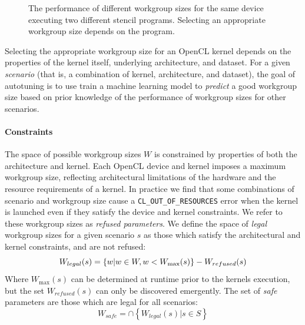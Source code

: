 \documentclass{acaces}
\begin{document}
\begin{figure}
{\begin{minipage}{.48\textwidth}
\begin{subfigure}[h]{.48\columnwidth}
      \vspace{-1.5em} %
      \caption{}
      \label{fig:motivation-4}
    \end{subfigure}
    \caption{%
      The performance of different workgroup sizes for the same device
      executing two different stencil programs. Selecting an appropriate
      workgroup size depends on the program.%
    }
    \label{fig:motivation-prog}
  \end{minipage}%
}
\end{figure}


Selecting the appropriate workgroup size for an OpenCL kernel depends
on the properties of the kernel itself, underlying architecture, and
dataset. For a given \emph{scenario} (that is, a combination of
kernel, architecture, and dataset), the goal of autotuning is to use
train a machine learning model to \emph{predict} a good workgroup size
based on prior knowledge of the performance of workgroup sizes for
other scenarios.

\paragraph{Constraints} The space of possible workgroup sizes $W$ is
constrained by properties of both the architecture and kernel. Each
OpenCL device and kernel imposes a maximum workgroup size, reflecting
architectural limitations of the hardware and the resource
requirements of a kernel. In practice we find that some combinations
of scenario and workgroup size cause a \texttt{CL\_OUT\_OF\_RESOURCES}
error when the kernel is launched even if they satisfy the device and
kernel constraints. We refer to these workgroup sizes as \emph{refused
  parameters}. We define the space of \emph{legal} workgroup sizes for
a given scenario $s$ as those which satisfy the architectural and
kernel constraints, and are not refused:
%
\begin{equation}
  \footnotesize
  W_{legal}(s) = \left\{w | w \in W, w < W_{\max}(s) \right\} - W_{refused}(s)
\end{equation}
%
Where $W_{\max}(s)$ can be determined at runtime prior to the kernels
execution, but the set $W_{refused}(s)$ can only be discovered
emergently. The set of \emph{safe} parameters are those which are
legal for all scenarios:
%
\begin{equation}
  W_{safe} = \cap \left\{ W_{legal}(s) | s \in S \right\}
\end{equation}
\end{document}
